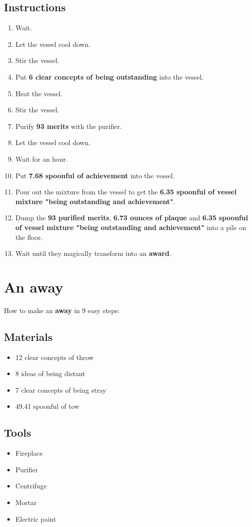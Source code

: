 \documentclass{article}
\begin{document}
\subsection{Instructions}\begin{enumerate}
\item 
Wait.
\item 
Let the vessel cool down.
\item 
Stir the vessel.
\item 
Put \textbf{6 clear concepts of being outstanding} into the vessel.
\item 
Heat the vessel.
\item 
Stir the vessel.
\item 
Purify \textbf{93 merits} with the purifier.
\item 
Let the vessel cool down.
\item 
Wait for an hour.
\item 
Put \textbf{7.68 spoonful of achievement} into the vessel.
\item 
Pour out the mixture from the vessel to get the \textbf{6.35 spoonful of vessel mixture "being outstanding and achievement"}.
\item 
Dump the \textbf{93 purified merits}, \textbf{6.73 ounces of plaque} and \textbf{6.35 spoonful of vessel mixture "being outstanding and achievement"} into a pile on the floor.
\item 
Wait until they magically transform into an \textbf{award}.
\end{enumerate}
\newpage
\section{An away}How to make an \textbf{away} in 9 easy steps:

\subsection{Materials}\begin{itemize}
\item 
12 clear concepts of throw
\item 
8 ideas of being distant
\item 
7 clear concepts of being stray
\item 
49.41 spoonful of tow
\end{itemize}
\subsection{Tools}\begin{itemize}
\item 
Fireplace
\item 
Purifier
\item 
Centrifuge
\item 
Mortar
\item 
Electric paint
\end{itemize}
\end{document}
